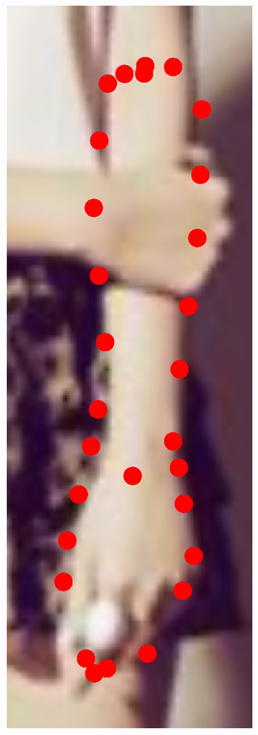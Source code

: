 \begin{figure}[!t]
    \includegraphics[height=\ofh]{resources/Fittings/23.eps}
    \hfill

\end{figure}
